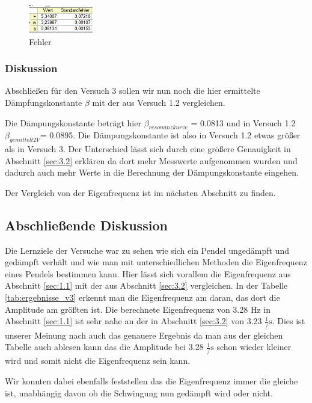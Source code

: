             \begin{figure}[H]
                \centering
                \includegraphics[width=0.25\textwidth]{bilder/fehler_v3.png}
                \caption{Fehler}
                \label{fig:fehler}
            \end{figure}
            \newpage
        \subsubsection{Diskussion}
        Abschließen für den Versuch 3 sollen wir nun noch die hier ermittelte Dämpfungskonstante $\beta$ mit der aus Versuch 1.2 vergleichen. 

        Die Dämpungskonstante beträgt hier $\beta_{resonanzkurve}$ = 0.0813 und in Versuch 1.2 $\beta_{gemittelt2V}$= 0.0895. Die Dämpungskonstante ist also in Versuch 1.2 etwas größer als in Versuch 3. Der Unterschied lässt sich durch eine größere Genauigkeit in Abschnitt \ref{sec:3.2} erklären da dort mehr Messwerte aufgenommen wurden und dadurch auch mehr Werte in die Berechnung der Dämpungskonstante eingehen.

        \noindent Der Vergleich von der Eigenfrequenz ist im nächsten Abschnitt zu finden. 

    \subsection{Abschließende Diskussion}
    Die Lernziele der Versuche war zu sehen wie sich ein Pendel ungedämpft und gedämpft verhält und wie man mit unterschiedlichen Methoden die Eigenfrequenz eines Pendels bestimmen kann. Hier lässt sich vorallem die Eigenfrequenz aus Abschnitt \ref{sec:1.1} mit der aus Abschnitt \ref{sec:3.2} vergleichen. In der Tabelle \ref{tab:ergebnisse_v3} erkennt man die Eigenfrequenz am daran, das dort die Amplitude am größten ist. Die berechnete Eigenfrequenz von 3.28 Hz in Abschnitt \ref{sec:1.1} ist sehr nahe an der in Abschnitt \ref{sec:3.2} von 3.23 $\frac{1}/{\mathrm{s}}$. Dies ist unserer Meinung nach auch das genauere Ergebnis da man aus der gleichen Tabelle auch ablesen kann das die Amplitude bei 3.28 $\frac{1}/{\mathrm{s}}$ schon wieder kleiner wird und somit nicht die Eigenfrequenz sein kann.
    
    \noindent Wir konnten dabei ebenfalls feststellen das die Eigenfrequenz immer die gleiche ist, unabhängig davon ob die Schwingung nun gedämpft wird oder nicht.